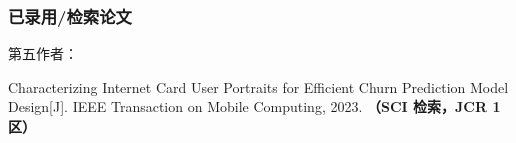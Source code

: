 \subsubsection*{已录用/检索论文}
第五作者：
\begin{enumerate}[label={[\arabic*]},itemindent=2em,wide]
	\item Characterizing Internet Card User Portraits for Efficient Churn Prediction Model Design[J]. IEEE Transaction on Mobile Computing, 2023. {\bfseries \heiti（SCI 检索，JCR 1 区）}
\end{enumerate}


